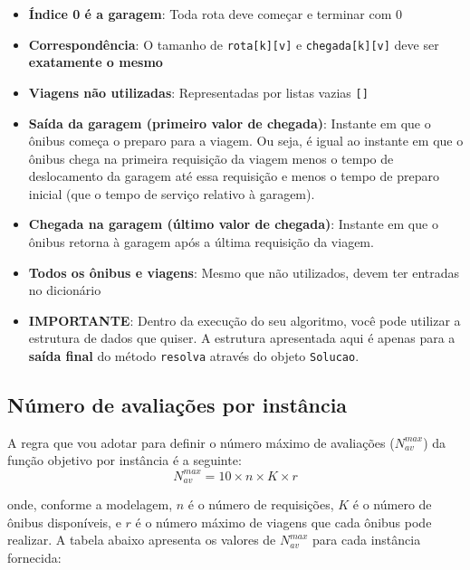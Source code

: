 \documentclass[12pt,a4paper]{article}
\begin{document}
\begin{tcolorbox}[colback=yellow!10!white,colframe=orange!75!black,title=\textbf{Pontos Importantes}]
\begin{itemize}
    \item \textbf{Índice 0 é a garagem}: Toda rota deve começar e terminar com 0
    \item \textbf{Correspondência}: O tamanho de \texttt{rota[k][v]} e \texttt{chegada[k][v]} deve ser \textbf{exatamente o mesmo}
    \item \textbf{Viagens não utilizadas}: Representadas por listas vazias \texttt{[]}
    \item \textbf{Saída da garagem (primeiro valor de chegada)}: Instante em que o ônibus começa o preparo para a viagem. Ou seja, é igual ao instante em que o ônibus chega na primeira requisição da viagem menos o tempo de deslocamento da garagem até essa requisição e menos o tempo de preparo inicial (que o tempo de serviço relativo à garagem).
    \item \textbf{Chegada na garagem (último valor de chegada)}: Instante em que o ônibus retorna à garagem após a última requisição da viagem.
    \item \textbf{Todos os ônibus e viagens}: Mesmo que não utilizados, devem ter entradas no dicionário
    \item \textbf{IMPORTANTE}: Dentro da execução do seu algoritmo, você pode utilizar a estrutura de dados que quiser. A estrutura apresentada aqui é apenas para a \textbf{saída final} do método \texttt{resolva} através do objeto \texttt{Solucao}.
\end{itemize}
\end{tcolorbox}

\subsection{Número de avaliações por instância}

A regra que vou adotar para definir o número máximo de avaliações ($N^{max}_{av}$) da função objetivo por instância é a seguinte:
\begin{equation}
    N^{max}_{av} = 10 \times n \times K \times r
\end{equation}

\noindent onde, conforme a modelagem, $n$ é o número de requisições, $K$ é o número de ônibus disponíveis, e $r$ é o número máximo de viagens que cada ônibus pode realizar. A tabela abaixo apresenta os valores de $N^{max}_{av}$ para cada instância fornecida:
\end{document}

